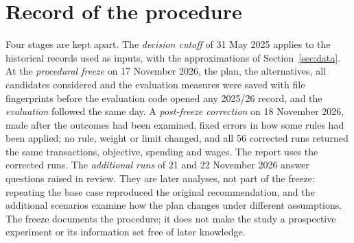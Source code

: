 \section{Record of the procedure}\label{app:history}

Four stages are kept apart. The \emph{decision cutoff} of 31 May 2025 applies to the historical records used as inputs, with the approximations of Section~\ref{sec:data}. At the \emph{procedural freeze} on 17 November 2026, the plan, the alternatives, all candidates considered and the evaluation measures were saved with file fingerprints before the evaluation code opened any 2025/26 record, and the \emph{evaluation} followed the same day. A \emph{post-freeze correction} on 18 November 2026, made after the outcomes had been examined, fixed errors in how some rules had been applied; no rule, weight or limit changed, and all 56 corrected runs returned the same transactions, objective, spending and wages. The report uses the corrected runs. The \emph{additional runs} of 21 and 22 November 2026 answer questions raised in review. They are later analyses, not part of the freeze: repeating the base case reproduced the original recommendation, and the additional scenarios examine how the plan changes under different assumptions. The freeze documents the procedure; it does not make the study a prospective experiment or its information set free of later knowledge.


